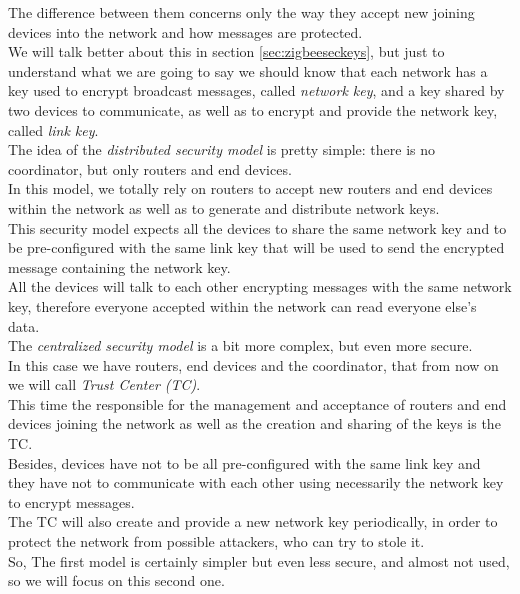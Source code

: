 \documentclass[12pt]{report}
\begin{document}
{{The difference between them concerns only the way they accept new joining devices into the network and how messages are protected.\\

We will talk better about this in section \ref{sec:zigbeeseckeys}, but just to understand what we are going to say we should know that each network has a key used to encrypt broadcast messages, called \emph{network key}, and a key shared by two devices to communicate, as well as to encrypt and provide the network key, called \emph{link key}.\\

The idea of the \emph{distributed security model} is pretty simple: there is no coordinator, but only routers and end devices.\\
In this model, we totally rely on routers to accept new routers and end devices within the network as well as to generate and distribute network keys.\\

This security model expects all the devices to share the same network key and to be pre-configured with the same link key that will be used to send the encrypted message containing the network key.\\
All the devices will talk to each other encrypting messages with the same network key, therefore everyone accepted within the network can read everyone else's data.\\

The \emph{centralized security model} is a bit more complex, but even more secure.\\
In this case we have routers, end devices and the coordinator, that from now on we will call \emph{Trust Center (TC)}.\\
This time the responsible for the management and acceptance of routers and end devices joining the network as well as the creation and sharing of the keys is the TC.\\
Besides, devices have not to be all pre-configured with the same link key and they have not to communicate with each other using necessarily the network key to encrypt messages.\\
The TC will also create and provide a new network key periodically, in order to protect the network from possible attackers, who can try to stole it.\\

So, The first model is certainly simpler but even less secure, and almost not used, so we will focus on this second one}.\\

}
\end{document}
